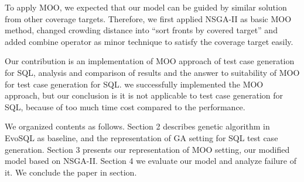 To apply MOO, we expected that our model can be guided by similar solution from other coverage targets. Therefore, we first applied NSGA-II as basic MOO method, changed crowding distance into ``sort fronts by covered target'' and added combine operator as minor technique to satisfy the coverage target easily.
 

Our contribution is an implementation of MOO approach of test case generation for SQL, analysis and comparison of results and the answer to suitability of MOO for test case generation for SQL. we successfully implemented the MOO approach, but our conclusion is it is not applicable to test case generation for SQL, because of too much time cost compared to the performance.

 
We organized contents as follows. Section 2 describes genetic algorithm in EvoSQL as baseline, and the representation of GA setting for SQL test case generation. Section 3 presents our representation of MOO setting, our modified model based on NSGA-II. Section 4 we evaluate our model and analyze failure of it. We conclude the paper in section.

